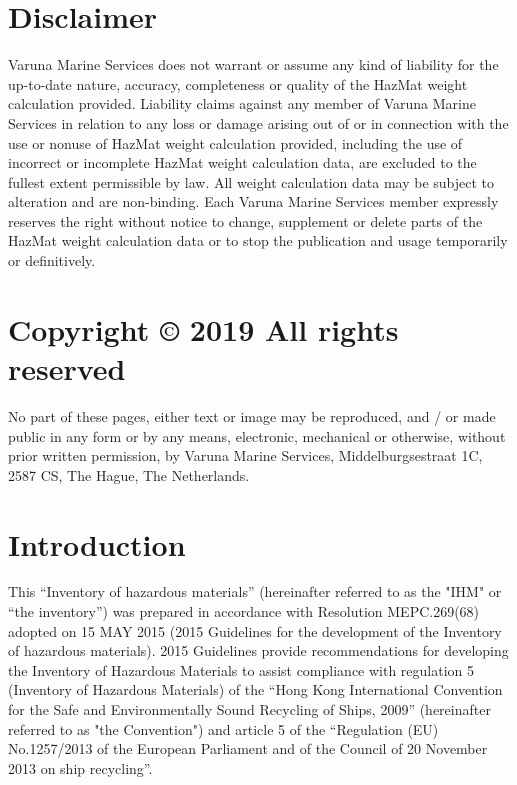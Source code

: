 \documentclass{article}
\begin{document}
\section{Disclaimer}
Varuna Marine Services does not warrant or assume any kind of liability for the up-to-date nature, accuracy,
completeness or quality of the HazMat weight calculation provided. Liability claims against any member of
Varuna Marine Services in relation to any loss or damage arising out of or in connection with the use or nonuse of HazMat weight calculation provided, including the use of incorrect or incomplete HazMat weight
calculation data, are excluded to the fullest extent permissible by law. All weight calculation data may be
subject to alteration and are non-binding. Each Varuna Marine Services member expressly reserves the
right without notice to change, supplement or delete parts of the HazMat weight calculation data or to stop
the publication and usage temporarily or definitively.
\section{Copyright © 2019 All rights reserved}
No part of these pages, either text or image may be reproduced, and / or made public in any form or by any
means, electronic, mechanical or otherwise, without prior written permission, by Varuna Marine Services,
Middelburgsestraat 1C, 2587 CS, The Hague, The Netherlands.

\newpage
\tableofcontents
\newpage
\listoffigures
\newpage
\listoftables

\newpage {} \setcounter{page}{1}

\section{Introduction}
This “Inventory of hazardous materials” (hereinafter referred to as the "IHM" or
“the inventory”) was prepared in accordance with Resolution MEPC.269(68)
adopted on 15 MAY 2015 (2015 Guidelines for the development of the Inventory
of hazardous materials).
2015 Guidelines provide recommendations for developing the Inventory of
Hazardous Materials to assist compliance with regulation 5 (Inventory of
Hazardous Materials) of the “Hong Kong International Convention for the Safe
and Environmentally Sound Recycling of Ships, 2009” (hereinafter referred to as
"the Convention") and article 5 of the “Regulation (EU) No.1257/2013 of the
European Parliament and of the Council of 20 November 2013 on ship recycling”.
\end{document}
